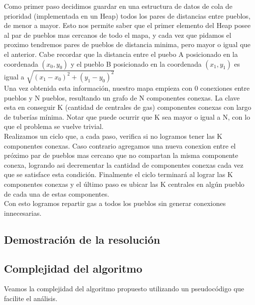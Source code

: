 Como primer paso decidimos guardar en una estructura de datos de cola de prioridad (implementada en un Heap) todos los pares de distancias entre pueblos, de menor a mayor. Esto nos permite saber que el primer elemento del Heap posee al par de pueblos mas cercanos de todo el mapa, y cada vez que pidamos el proximo tendremos pares de pueblos de distancia minima, pero mayor o igual que el anterior. Cabe recordar que la distancia entre el puebo A posicionado en la coordenada $(x_0,y_0)$ y el pueblo B posicionado en la coordenada $(x_1,y_1)$ es igual a $\sqrt{(x_1-x_0)^2+(y_1-y_0)^2}$ \\

Una vez obtenida esta informaci\'on, nuestro mapa empieza con 0 conexiones entre pueblos y N pueblos, resultando un grafo de N componentes conexas. La clave esta en conseguir K (cantidad de centrales de gas) componentes conexas con largo de tuber\'ias m\'inima. Notar que puede ocurrir que K sea mayor o igual a N, con lo que el problema se vuelve trivial. \\

Realizamos un ciclo que, a cada paso, verifica si no logramos tener las K componentes conexas. Caso contrario agregamos una nueva conexion entre el pr\'oximo par de pueblos mas cercano que no compartan la misma componente conexa, logrando asi decrementar la cantidad de componentes conexas cada vez que se satisface esta condici\'on. Finalmente el ciclo terminar\'a al lograr las K componentes conexas y el \'ultimo paso es ubicar las K centrales en alg\'un pueblo de cada una de estas componentes.\\

Con esto logramos repartir gas a todos los pueblos sin generar conexiones innecesarias.

\subsection{Demostraci\'on de la resoluci\'on}

\subsection{Complejidad del algoritmo}

Veamos la complejidad del algoritmo propuesto utilizando un pseudoc\'odigo que facilite el an\'alisis.\\

